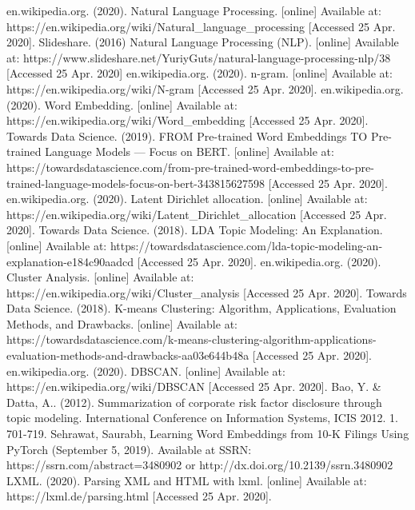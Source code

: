 \documentclass[12pt]{report}
\begin{document}
\begin{thebibliography}{9}
\label{References}
en.wikipedia.org. (2020). Natural Language Processing. [online] Available at: https://en.wikipedia.org/wiki/Natural\_language\_processing [Accessed 25 Apr. 2020].
Slideshare. (2016) Natural Language Processing (NLP). [online] Available at: https://www.slideshare.net/YuriyGuts/natural-language-processing-nlp/38 [Accessed 25 Apr. 2020]
en.wikipedia.org. (2020). n-gram. [online] Available at: https://en.wikipedia.org/wiki/N-gram [Accessed 25 Apr. 2020].
en.wikipedia.org. (2020). Word Embedding. [online] Available at: https://en.wikipedia.org/wiki/Word\_embedding [Accessed 25 Apr. 2020].
Towards Data Science. (2019). FROM Pre-trained Word Embeddings TO Pre-trained Language Models — Focus on BERT. [online] Available at: https://towardsdatascience.com/from-pre-trained-word-embeddings-to-pre-trained-language-models-focus-on-bert-343815627598 [Accessed 25 Apr. 2020].
en.wikipedia.org. (2020). Latent Dirichlet allocation. [online] Available at: https://en.wikipedia.org/wiki/Latent\_Dirichlet\_allocation [Accessed 25 Apr. 2020].
Towards Data Science. (2018). LDA Topic Modeling: An Explanation. [online] Available at: https://towardsdatascience.com/lda-topic-modeling-an-explanation-e184c90aadcd [Accessed 25 Apr. 2020].
en.wikipedia.org. (2020). Cluster Analysis. [online] Available at: https://en.wikipedia.org/wiki/Cluster\_analysis [Accessed 25 Apr. 2020].
Towards Data Science. (2018). K-means Clustering: Algorithm, Applications, Evaluation Methods, and Drawbacks. [online] Available at: https://towardsdatascience.com/k-means-clustering-algorithm-applications-evaluation-methods-and-drawbacks-aa03e644b48a [Accessed 25 Apr. 2020].
en.wikipedia.org. (2020). DBSCAN. [online] Available at: https://en.wikipedia.org/wiki/DBSCAN [Accessed 25 Apr. 2020].
Bao, Y. \& Datta, A.. (2012). Summarization of corporate risk factor disclosure through topic modeling. International Conference on Information Systems, ICIS 2012. 1. 701-719.
Sehrawat, Saurabh, Learning Word Embeddings from 10-K Filings Using PyTorch (September 5, 2019). Available at SSRN: https://ssrn.com/abstract=3480902 or http://dx.doi.org/10.2139/ssrn.3480902
LXML. (2020). Parsing XML and HTML with lxml. [online] Available at: https://lxml.de/parsing.html [Accessed 25 Apr. 2020].

\end{thebibliography}
\end{document}
